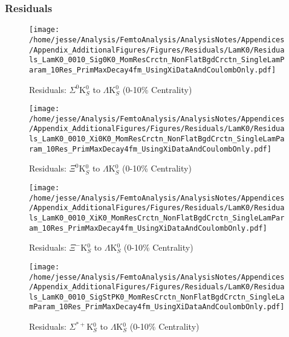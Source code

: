 \documentclass[/home/jesse/Analysis/FemtoAnalysis/AnalysisNotes/AnalysisNoteJBuxton.tex]{subfiles}
\begin{document}
\subsubsection{\LamKs Residuals}
\label{Residuals_LamK0}

\begin{figure}[h]
  \centering
  \texttt{[image: /home/jesse/Analysis/FemtoAnalysis/AnalysisNotes/Appendices/Appendix\_AdditionalFigures/Figures/Residuals/LamK0/Residuals\_LamK0\_0010\_Sig0K0\_MomResCrctn\_NonFlatBgdCrctn\_SingleLamParam\_10Res\_PrimMaxDecay4fm\_UsingXiDataAndCoulombOnly.pdf]}
  \caption[Residuals: $\Sigma^{0}$K$^{0}_{S}$ to $\Lambda$K$^{0}_{S}$ (0-10\% Centrality)]{Residuals: $\Sigma^{0}$K$^{0}_{S}$ to $\Lambda$K$^{0}_{S}$ (0-10\% Centrality)}
  \label{fig:Res_LamK0_0010_Sig0K0}
\end{figure}


\begin{figure}[h]
  \centering
  \texttt{[image: /home/jesse/Analysis/FemtoAnalysis/AnalysisNotes/Appendices/Appendix\_AdditionalFigures/Figures/Residuals/LamK0/Residuals\_LamK0\_0010\_Xi0K0\_MomResCrctn\_NonFlatBgdCrctn\_SingleLamParam\_10Res\_PrimMaxDecay4fm\_UsingXiDataAndCoulombOnly.pdf]}
  \caption[Residuals: $\Xi^{0}$K$^{0}_{S}$ to $\Lambda$K$^{0}_{S}$ (0-10\% Centrality)]{Residuals: $\Xi^{0}$K$^{0}_{S}$ to $\Lambda$K$^{0}_{S}$ (0-10\% Centrality)}
  \label{fig:Res_LamK0_0010_Xi0K0}
\end{figure}


\begin{figure}[h]
  \centering
  \texttt{[image: /home/jesse/Analysis/FemtoAnalysis/AnalysisNotes/Appendices/Appendix\_AdditionalFigures/Figures/Residuals/LamK0/Residuals\_LamK0\_0010\_XiK0\_MomResCrctn\_NonFlatBgdCrctn\_SingleLamParam\_10Res\_PrimMaxDecay4fm\_UsingXiDataAndCoulombOnly.pdf]}
  \caption[Residuals: $\Xi^{-}$K$^{0}_{S}$ to $\Lambda$K$^{0}_{S}$ (0-10\% Centrality)]{Residuals: $\Xi^{-}$K$^{0}_{S}$ to $\Lambda$K$^{0}_{S}$ (0-10\% Centrality)}
  \label{fig:Res_LamK0_0010_XiCK0}
\end{figure}


\begin{figure}[h]
  \centering
  \texttt{[image: /home/jesse/Analysis/FemtoAnalysis/AnalysisNotes/Appendices/Appendix\_AdditionalFigures/Figures/Residuals/LamK0/Residuals\_LamK0\_0010\_SigStPK0\_MomResCrctn\_NonFlatBgdCrctn\_SingleLamParam\_10Res\_PrimMaxDecay4fm\_UsingXiDataAndCoulombOnly.pdf]}
  \caption[Residuals: $\Sigma^{*+}$K$^{0}_{S}$ to $\Lambda$K$^{0}_{S}$ (0-10\% Centrality)]{Residuals: $\Sigma^{*+}$K$^{0}_{S}$ to $\Lambda$K$^{0}_{S}$ (0-10\% Centrality)}
  \label{fig:Res_LamK0_0010_SigStPK0}
\end{figure}
\end{document}
